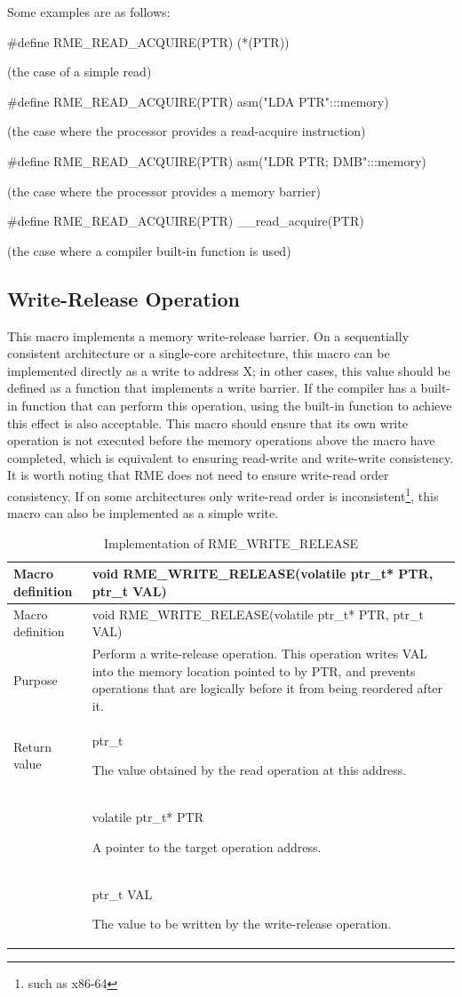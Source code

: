 Some examples are as follows:

\#define RME\_READ\_ACQUIRE(PTR) (*(PTR))

(the case of a simple read)

\#define RME\_READ\_ACQUIRE(PTR) asm("LDA PTR":::memory)

(the case where the processor provides a read-acquire instruction)

\#define RME\_READ\_ACQUIRE(PTR) asm("LDR PTR; DMB":::memory)

(the case where the processor provides a memory barrier)

\#define RME\_READ\_ACQUIRE(PTR) \_\_read\_acquire(PTR)

(the case where a compiler built-in function is used)

\subsection{Write-Release Operation}\label{subsec:7-write-release-operation}

This macro implements a memory write-release barrier. On a sequentially consistent architecture or a single-core architecture, this macro can be implemented directly as a write to address X; in other cases, this value should be defined as a function that implements a write barrier. If the compiler has a built-in function that can perform this operation, using the built-in function to achieve this effect is also acceptable. This macro should ensure that its own write operation is not executed before the memory operations above the macro have completed, which is equivalent to ensuring read-write and write-write consistency. It is worth noting that RME does not need to ensure write-read order consistency. If on some architectures only write-read order is inconsistent\footnote{such as x86-64}, this macro can also be implemented as a simple write.

\begin{xltabular}{\textwidth}{@{}>{\hsize\raggedright\arraybackslash}X>{\hsize\raggedright\arraybackslash}X@{}}
\caption{Implementation of RME\_WRITE\_RELEASE}\label{tab:7-30-rme-write-release-implementation}\\
\toprule
Macro definition & void RME\_WRITE\_RELEASE(volatile ptr\_t* PTR, ptr\_t
VAL)\tabularnewline
\endfirsthead
\toprule
Macro definition & void RME\_WRITE\_RELEASE(volatile ptr\_t* PTR, ptr\_t
VAL)\tabularnewline
\midrule
\endhead
\bottomrule
\endlastfoot
Purpose &
Perform a write-release operation. This operation writes VAL into the memory location pointed to by PTR, and prevents operations that are logically before it from being reordered after it.\tabularnewline
Return value\strut
 & ptr\_t

The value obtained by the read operation at this address.\strut
\tabularnewline
{} & volatile ptr\_t* PTR

A pointer to the target operation address.\strut
\tabularnewline
\strut
 & ptr\_t VAL

The value to be written by the write-release operation.\strut
\tabularnewline
\end{xltabular}
\nopagebreak[4]

